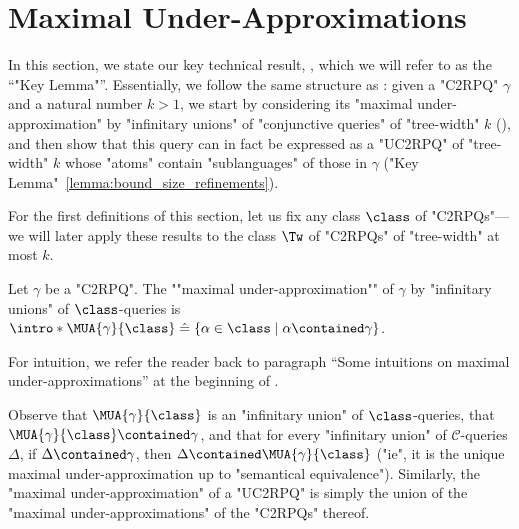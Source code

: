 \section{\AP{}Maximal Under-Approximations}
\label{sec:maximal-under-approximations}

In this section, we state our key technical result, , which we will refer to as the ``"Key Lemma"''.
Essentially, we follow the same structure as :
given a "C2RPQ" $\gamma$ and a natural number $k>1$, we start by
considering its "maximal under-approximation" by "infinitary unions"
of "conjunctive queries" of "tree-width" $k$ (),
and then show that this query can in fact be expressed as a
"UC2RPQ" of "tree-width" $k$ whose "atoms" contain "sublanguages" of those in $\gamma$ ("Key Lemma"~\ref{lemma:bound_size_refinements}).

\AP For the first definitions of this section, let us fix any class $\class$ of "C2RPQs"---we will later apply these results to the class $\Tw$ of "C2RPQs" of "tree-width" at most $k$.

\begin{definition}
    \AP\label{def:max-under-approx}
    \AP Let $\gamma$ be a "C2RPQ". The \AP""maximal under-approximation"" of $\gamma$ by "infinitary unions" of $\class$-queries is $\intro*\MUA{\gamma}{\class} \defeq
    \{ \alpha \in \class \mid \alpha \contained\gamma \}$.
\end{definition}
For intuition, we refer the reader back to paragraph ``Some intuitions on maximal under-approximations'' at the beginning of .


\begin{remark}
    \AP\label{rk:uctworpq}
    Observe that $\MUA{\gamma}{\class}$ is an "infinitary union" of $\class$-queries,
    that $\MUA{\gamma}{\class} \contained \gamma$, and that for every "infinitary union" of
    $\mathcal{C}$-queries $\Delta$, if $\Delta \contained \gamma$, then $\Delta \contained \MUA{\gamma}{\class}$ ("ie", it is the unique maximal under-approximation up to "semantical equivalence").
    Similarly, the "maximal under-approximation" of a "UC2RPQ" is simply the union of the "maximal under-approximations" of the "C2RPQs" thereof.
\end{remark}



